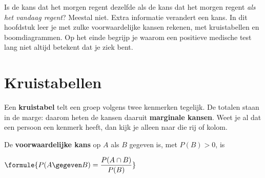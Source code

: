 %



Is de kans dat het morgen regent dezelfde als de kans dat het morgen regent \textit{als het vandaag regent}? Meestal niet. Extra informatie verandert een kans. In dit hoofdstuk leer je met zulke voorwaardelijke kansen rekenen, met kruistabellen en boomdiagrammen. Op het einde begrijp je waarom een positieve medische test lang niet altijd betekent dat je ziek bent.

\begin{oefeningen}[Start]

\end{oefeningen}


\section{Kruistabellen}

Een \textbf{kruistabel} telt een groep volgens twee kenmerken tegelijk. De totalen staan in de marge: daarom heten de kansen daaruit \textbf{marginale kansen}. Weet je al dat een persoon een kenmerk heeft, dan kijk je alleen naar die rij of kolom.

\begin{theorie}
De \textbf{\textcolor{accent}{voorwaardelijke kans}} op $A$ als $B$ gegeven is, met $P(B) > 0$, is

\vspace{1mm}
\qquad $\formule{P(A \gegeven B) = \dfrac{P(A \cap B)}{P(B)}}$
\end{theorie}

